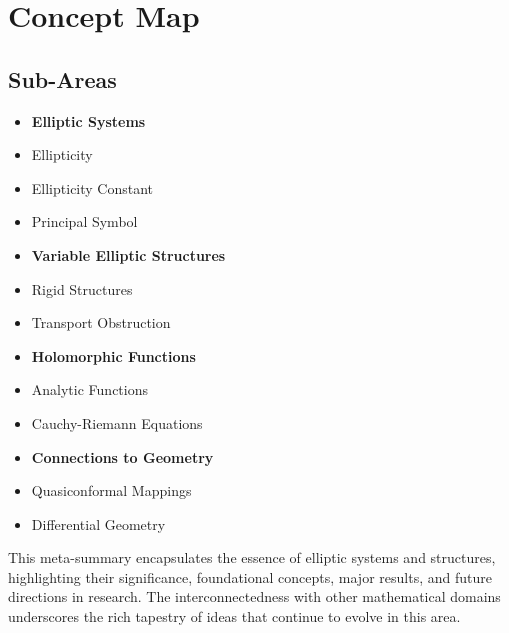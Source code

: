 \documentclass[11pt,a4paper]{article}
\begin{document}
\section{Concept Map}

\subsection{Sub-Areas}
\begin{itemize}
\item \textbf{Elliptic Systems}
\item Ellipticity
\item Ellipticity Constant
\item Principal Symbol
\item \textbf{Variable Elliptic Structures}
\item Rigid Structures
\item Transport Obstruction
\item \textbf{Holomorphic Functions}
\item Analytic Functions
\item Cauchy-Riemann Equations
\item \textbf{Connections to Geometry}
\item Quasiconformal Mappings
\item Differential Geometry
\end{itemize}

This meta-summary encapsulates the essence of elliptic systems and structures, highlighting their significance, foundational concepts, major results, and future directions in research. The interconnectedness with other mathematical domains underscores the rich tapestry of ideas that continue to evolve in this area.
\end{document}
